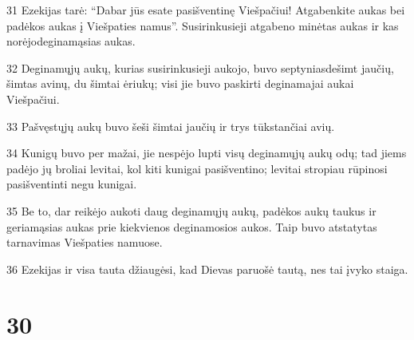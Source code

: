 \par 31 Ezekijas tarė: “Dabar jūs esate pasišventinę Viešpačiui! Atgabenkite aukas bei padėkos aukas į Viešpaties namus”. Susirinkusieji atgabeno minėtas aukas ir kas norėjo­deginamąsias aukas. 
\par 32 Deginamųjų aukų, kurias susirinkusieji aukojo, buvo septyniasdešimt jaučių, šimtas avinų, du šimtai ėriukų; visi jie buvo paskirti deginamajai aukai Viešpačiui. 
\par 33 Pašvęstųjų aukų buvo šeši šimtai jaučių ir trys tūkstančiai avių. 
\par 34 Kunigų buvo per mažai, jie nespėjo lupti visų deginamųjų aukų odų; tad jiems padėjo jų broliai levitai, kol kiti kunigai pasišventino; levitai stropiau rūpinosi pasišventinti negu kunigai. 
\par 35 Be to, dar reikėjo aukoti daug deginamųjų aukų, padėkos aukų taukus ir geriamąsias aukas prie kiekvienos deginamosios aukos. Taip buvo atstatytas tarnavimas Viešpaties namuose. 
\par 36 Ezekijas ir visa tauta džiaugėsi, kad Dievas paruošė tautą, nes tai įvyko staiga.



\chapter{30}

